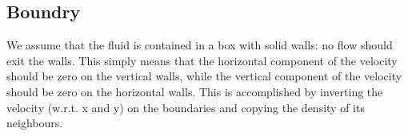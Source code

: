 \subsection{Boundry}
We assume that the fluid is contained in a box with solid walls: no flow should exit the walls. This simply means that the horizontal component of the velocity should be zero on the vertical walls, while the vertical component of the velocity should be zero on the horizontal walls. This is accomplished by inverting the velocity (w.r.t. x and y) on the boundaries and copying the density of its neighbours.
